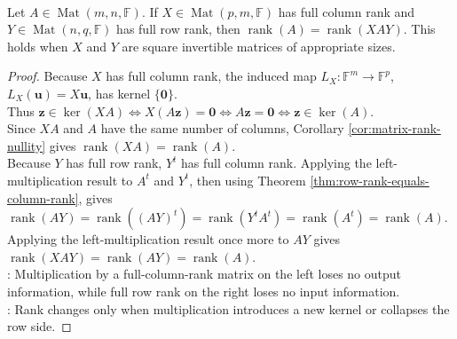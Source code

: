 \begin{theorem} \label{thm:full-rank-products-preserve-rank} \\
Let $A\in\operatorname{Mat}(m,n,\mathbb{F})$. If $X\in\operatorname{Mat}(p,m,\mathbb{F})$ has full column rank and $Y\in\operatorname{Mat}(n,q,\mathbb{F})$ has full row rank, then $\operatorname{rank}(A)=\operatorname{rank}(XAY)$. This holds when $X$ and $Y$ are square invertible matrices of appropriate sizes.
\begin{proof}
Because $X$ has full column rank, the induced map $L_X:\mathbb{F}^m\to\mathbb{F}^p$, $L_X(\mathbf{u})=X\mathbf{u}$, has kernel $\{\mathbf{0}\}$.\\
Thus $\mathbf{z}\in\ker(XA) \iff X(A\mathbf{z})=\mathbf{0} \iff A\mathbf{z}=\mathbf{0} \iff \mathbf{z}\in\ker(A)$.\\
Since $XA$ and $A$ have the same number of columns, Corollary \ref{cor:matrix-rank-nullity} gives $\operatorname{rank}(XA)=\operatorname{rank}(A)$.\\
Because $Y$ has full row rank, $Y^t$ has full column rank. Applying the left-multiplication result to $A^t$ and $Y^t$, then using Theorem \ref{thm:row-rank-equals-column-rank}, gives $\operatorname{rank}(AY)=\operatorname{rank}((AY)^t) =\operatorname{rank}(Y^tA^t) =\operatorname{rank}(A^t) =\operatorname{rank}(A)$.\\
Applying the left-multiplication result once more to $AY$ gives $\operatorname{rank}(XAY)=\operatorname{rank}(AY)=\operatorname{rank}(A)$.\\
: Multiplication by a full-column-rank matrix on the left loses no output information, while full row rank on the right loses no input information.\\
: Rank changes only when multiplication introduces a new kernel or collapses the row side.
\end{proof}
\end{theorem}


